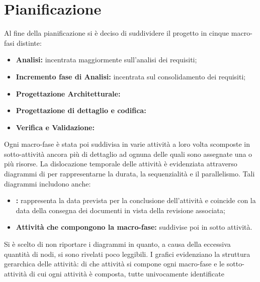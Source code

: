 \section{Pianificazione}

Al fine della pianificazione si è deciso di suddividere il progetto in cinque macro-fasi distinte:
\begin{itemize}
\item \textbf{Analisi:} incentrata maggiormente sull'analisi dei requisiti;
\item \textbf{Incremento fase di Analisi:} incentrata sul consolidamento dei requisiti;
\item \textbf{Progettazione Architetturale:}
\item \textbf{Progettazione di dettaglio e codifica:}
\item \textbf{Verifica e Validazione:}
\end{itemize}
Ogni macro-fase è stata poi suddivisa in varie attività a loro volta scomposte in sotto-attività ancora più di dettaglio ad ognuna delle quali sono assegnate una o più risorse. La dislocazione temporale delle attività è evidenziata attraverso diagrammi di  per rappresentarne la durata, la sequenzialità e il parallelismo. Tali diagrammi includono anche:
\begin{itemize}
\item \textbf{:} rappresenta la data prevista per la conclusione dell'attività e coincide con la data della consegna dei documenti in vista della revisione associata;
\item \textbf{Attività che compongono la macro-fase:} suddivise poi in sotto attività.
\end{itemize}
Si è scelto di non riportare i diagrammi  in quanto, a causa della eccessiva quantità di nodi, si sono rivelati poco leggibili. I grafici  evidenziano la struttura gerarchica delle attività: di che attività si compone ogni macro-fase e le sotto-attività di cui ogni attività è composta, tutte univocamente identificate 

